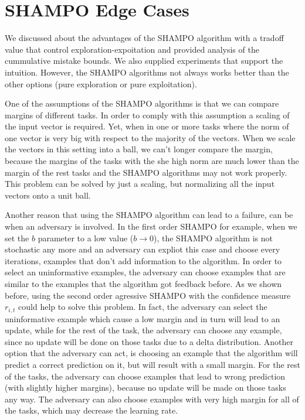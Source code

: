 \section{SHAMPO Edge Cases}
We discussed about the advantages of the SHAMPO algorithm with a tradoff value that control 
exploration-expoitation and  provided analysis of the cummulative mistake 
bounds. We also supplied experiments that support the intuition.  However, the 
SHAMPO algorithms not always works better than the other options (pure exploration or pure 
exploitation). 

One of the assumptions of  the SHAMPO algorithms is that we can 
compare margins of different tasks. In order to comply with this  assumption 
a scaling of the input vector is required. Yet, when in one or more tasks 
where  the norm of one vector is very big with respect to the majority of the 
vectors. When we scale the vectors in this setting into a ball, we can't longer compare the 
margin, because the margins of the tasks with the she high  norm are much lower 
than the margin of the rest tasks and the SHAMPO algorithms may not work properly. 
This problem can be solved by just a scaling, but normalizing all the input 
vectors onto a unit ball.

Another reason that using the SHAMPO algorithm can lead to a failure, can be 
when an adversary is involved. In the first order SHAMPO for example, when we 
set the $b$ parameter to a low value ($b \rightarrow 0$), the SHAMPO algorithm 
is not stochastic any more and an adversary can expliot this case and choose 
every iterations, examples that don't add information to the algorithm. In order to select an uninformative 
examples, the adversary can choose  examples that are similar to the examples 
that the algorithm got feedback before. As we shown before, using the second order agressive 
SHAMPO with the confidence measure $r_{i,t}$ could help to solve this problem.
 In fact, the adversary can select the 
uninformative example which cause a low margin and in turn will lead to an update, while for the rest 
of the task, the adversary can choose any example, since no update will be done on those 
tasks due to a delta distribution. Another option that the adversary can act, is 
choosing an example that the algorithm will predict a correct prediction on it, 
but will result with a small margin. For the rest of the tasks, the adversary 
can choose examples that lead to wrong prediction (with slightly higher margins), because no update will be 
made on those tasks any way. The adversary can also choose  examples with very high margin for all of the tasks, 
which may decrease the learning rate. 

